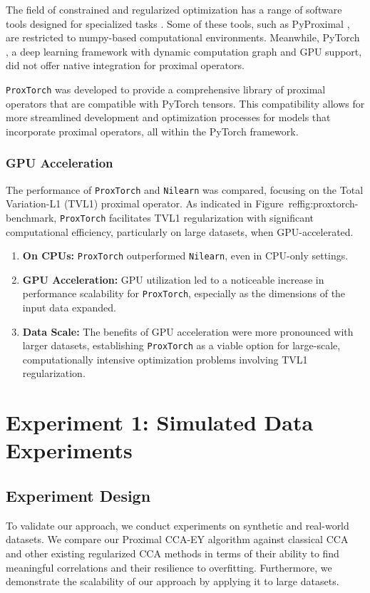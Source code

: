 The field of constrained and regularized optimization has a range of software tools designed for specialized tasks \citep{Moolekamp, ParsimonY}. Some of these tools, such as PyProximal \citep{pyproximal}, are restricted to numpy-based computational environments. Meanwhile, PyTorch \citep{paszke2019pytorch}, a deep learning framework with dynamic computation graph and GPU support, did not offer native integration for proximal operators.

\texttt{ProxTorch} was developed to provide a comprehensive library of proximal operators that are compatible with PyTorch tensors. This compatibility allows for more streamlined development and optimization processes for models that incorporate proximal operators, all within the PyTorch framework.

\subsubsection{GPU Acceleration}

The performance of \texttt{ProxTorch} and \texttt{Nilearn} was compared, focusing on the Total Variation-L1 (TVL1) proximal operator. As indicated in Figure~ref{fig:proxtorch-benchmark}, \texttt{ProxTorch} facilitates TVL1 regularization with significant computational efficiency, particularly on large datasets, when GPU-accelerated.

\begin{enumerate}
    \item \textbf{On CPUs:} \texttt{ProxTorch} outperformed \texttt{Nilearn}, even in CPU-only settings.

    \item \textbf{GPU Acceleration:} GPU utilization led to a noticeable increase in performance scalability for \texttt{ProxTorch}, especially as the dimensions of the input data expanded.

    \item \textbf{Data Scale:} The benefits of GPU acceleration were more pronounced with larger datasets, establishing \texttt{ProxTorch} as a viable option for large-scale, computationally intensive optimization problems involving TVL1 regularization.
\end{enumerate}


\section{Experiment 1: Simulated Data Experiments}

\subsection{Experiment Design}
To validate our approach, we conduct experiments on synthetic and real-world datasets.
We compare our Proximal CCA-EY algorithm against classical CCA and other existing regularized CCA methods in terms of their ability to find meaningful correlations and their resilience to overfitting.
Furthermore, we demonstrate the scalability of our approach by applying it to large datasets.


